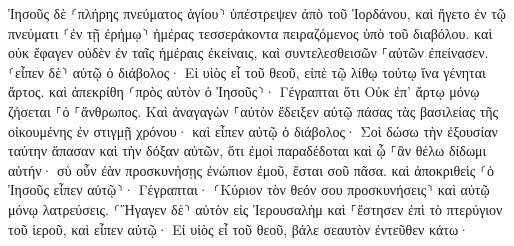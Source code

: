 \documentclass{openreader}
\begin{document}
Ἰησοῦς δὲ ⸂πλήρης πνεύματος ἁγίου⸃ ὑπέστρεψεν ἀπὸ τοῦ Ἰορδάνου, καὶ ἤγετο ἐν τῷ πνεύματι ⸂ἐν τῇ ἐρήμῳ⸃ 
ἡμέρας τεσσεράκοντα πειραζόμενος ὑπὸ τοῦ διαβόλου. καὶ οὐκ ἔφαγεν οὐδὲν ἐν ταῖς ἡμέραις ἐκείναις, καὶ συντελεσθεισῶν ⸀αὐτῶν ἐπείνασεν. 
⸂εἶπεν δὲ⸃ αὐτῷ ὁ διάβολος· Εἰ υἱὸς εἶ τοῦ θεοῦ, εἰπὲ τῷ λίθῳ τούτῳ ἵνα γένηται ἄρτος. 
καὶ ἀπεκρίθη ⸂πρὸς αὐτὸν ὁ Ἰησοῦς⸃· Γέγραπται ὅτι Οὐκ ἐπ’ ἄρτῳ μόνῳ ζήσεται ⸀ὁ ⸀ἄνθρωπος. 
Καὶ ἀναγαγὼν ⸀αὐτὸν ἔδειξεν αὐτῷ πάσας τὰς βασιλείας τῆς οἰκουμένης ἐν στιγμῇ χρόνου· 
καὶ εἶπεν αὐτῷ ὁ διάβολος· Σοὶ δώσω τὴν ἐξουσίαν ταύτην ἅπασαν καὶ τὴν δόξαν αὐτῶν, ὅτι ἐμοὶ παραδέδοται καὶ ᾧ ⸀ἂν θέλω δίδωμι αὐτήν· 
σὺ οὖν ἐὰν προσκυνήσῃς ἐνώπιον ἐμοῦ, ἔσται σοῦ πᾶσα. 
καὶ ἀποκριθεὶς ⸂ὁ Ἰησοῦς εἶπεν αὐτῷ⸃· Γέγραπται· ⸂Κύριον τὸν θεόν σου προσκυνήσεις⸃ καὶ αὐτῷ μόνῳ λατρεύσεις. 
⸂Ἤγαγεν δὲ⸃ αὐτὸν εἰς Ἰερουσαλὴμ καὶ ⸀ἔστησεν ἐπὶ τὸ πτερύγιον τοῦ ἱεροῦ, καὶ εἶπεν αὐτῷ· Εἰ υἱὸς εἶ τοῦ θεοῦ, βάλε σεαυτὸν ἐντεῦθεν κάτω· 
\end{document}
